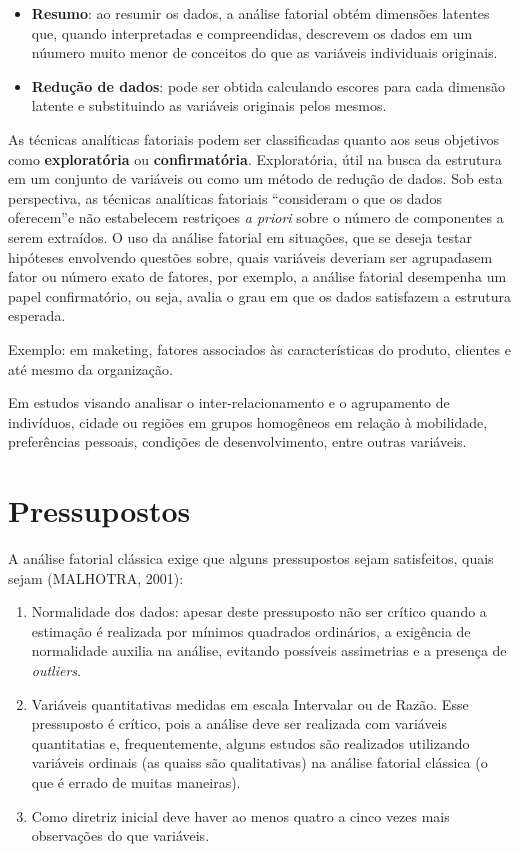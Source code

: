 \documentclass[12pt,brazil,oneside]{book}
\begin{document}
\begin{itemize}
\item
  \textbf{Resumo}: ao resumir os dados, a análise fatorial obtém dimensões latentes que, quando interpretadas e compreendidas, descrevem os dados em um núumero muito menor de conceitos do que as variáveis individuais originais.
\item
  \textbf{Redução de dados}: pode ser obtida calculando escores para cada dimensão latente e substituindo as variáveis originais pelos mesmos.
\end{itemize}

As técnicas analíticas fatoriais podem ser classificadas quanto aos seus objetivos como \textbf{exploratória} ou \textbf{confirmatória}. Exploratória, útil na busca da estrutura em um conjunto de variáveis ou como um método de redução de dados. Sob esta perspectiva, as técnicas analíticas fatoriais ``consideram o que os dados oferecem''e não estabelecem restriçoes \emph{a priori} sobre o número de componentes a serem extraídos. O uso da análise fatorial em situações, que se deseja testar hipóteses envolvendo questões sobre, quais variáveis deveriam ser agrupadasem fator ou número exato de fatores, por exemplo, a análise fatorial desempenha um papel confirmatório, ou seja, avalia o grau em que os dados satisfazem a estrutura esperada.

Exemplo: em maketing, fatores associados às características do produto, clientes e até mesmo da organização.

Em estudos visando analisar o inter-relacionamento e o agrupamento de indivíduos, cidade ou regiões em grupos homogêneos em relação à mobilidade, preferências pessoais, condições de desenvolvimento, entre outras variáveis.

\hypertarget{pressupostos}{%
\section{Pressupostos}\label{pressupostos}}

A análise fatorial clássica exige que alguns pressupostos sejam satisfeitos, quais sejam (MALHOTRA, 2001):

\begin{enumerate}
\def\labelenumi{\alph{enumi}.}
\item
  Normalidade dos dados: apesar deste pressuposto não ser crítico quando a estimação é realizada por mínimos quadrados ordinários, a exigência de normalidade auxilia na análise, evitando possíveis assimetrias e a presença de \emph{outliers}.
\item
  Variáveis quantitativas medidas em escala Intervalar ou de Razão. Esse pressuposto é crítico, pois a análise deve ser realizada com variáveis quantitatias e, frequentemente, alguns estudos são realizados utilizando variáveis ordinais (as quaiss são qualitativas) na análise fatorial clássica (o que é errado de muitas maneiras).
\item
  Como diretriz inicial deve haver ao menos quatro a cinco vezes mais observações do que variáveis.
\end{enumerate}
\end{document}
